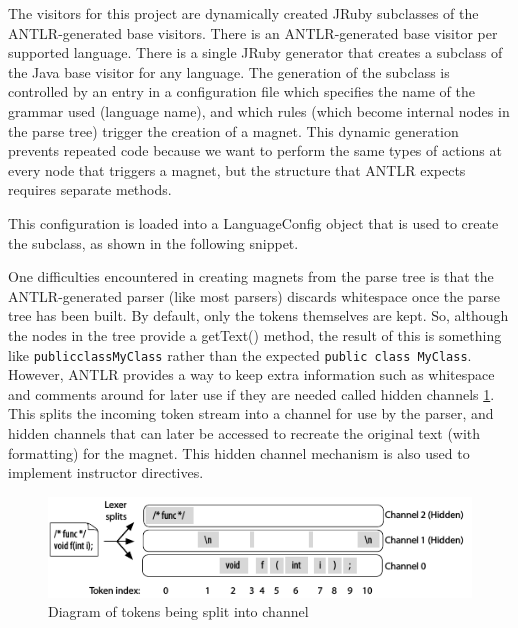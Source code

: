 \documentclass[letter,10pt,final]{article}
\begin{document}
The visitors for this project are dynamically created JRuby subclasses 
of the ANTLR-generated base visitors. There is an ANTLR-generated base 
visitor per supported language. There is a single JRuby generator that 
creates a subclass of the Java base visitor for any language. The 
generation of the subclass is controlled by an entry in a configuration 
file which specifies the name of the grammar used (language name), and 
which rules (which become internal nodes in the parse tree) trigger the 
creation of a magnet. This dynamic generation prevents repeated code 
because we want to perform the same types of actions at every node that 
triggers a magnet, but the structure that ANTLR expects requires 
separate methods.



This configuration is loaded into a LanguageConfig object that is used 
to create the subclass, as shown in the following snippet.



One difficulties encountered in creating magnets from the parse tree 
is that the ANTLR-generated parser (like most parsers) discards 
whitespace once the parse tree has been built. By default, only the 
tokens themselves are kept. So, although the nodes in the tree 
provide a getText() method, the result of this is something 
like \verb~publicclassMyClass~ rather than the expected 
\verb~public class MyClass~. However, ANTLR provides a way to keep extra
information such as whitespace and comments around for later use if they 
are needed called hidden channels \ref{fig:channels}. This splits the 
incoming token stream into a channel for use by the parser, and hidden 
channels that can later be accessed to recreate the original text (with 
formatting) for the magnet. This hidden channel mechanism is also used 
to implement instructor directives.

\begin{figure}
 \centering
 \includegraphics{./images/antlr-hidden-channels.png}
 \caption{Diagram of tokens being split into %
channel \cite[207]{antlr-reference}}
 \label{fig:channels}
\end{figure}
\end{document}
